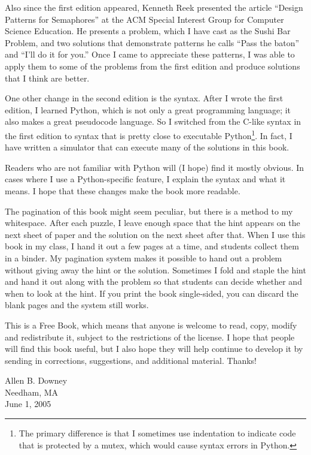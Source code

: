 \documentclass{book}
\begin{document}
Also since the first edition appeared, Kenneth Reek presented the article ``Design Patterns for Semaphores'' at the ACM Special Interest Group for Computer Science Education. He presents a problem, which I have cast as the Sushi Bar Problem, and two solutions that demonstrate patterns he calls ``Pass the baton'' and ``I'll do it for you.'' Once I came to appreciate these patterns, I was able to apply them to some of the problems from the first edition and produce solutions that I think are better.

One other change in the second edition is the syntax. After I wrote the first edition, I learned Python, which is not only a great programming language; it also makes a great pseudocode language.  So I switched from the C-like syntax in the first edition to syntax that is pretty close to executable Python\footnote{The primary difference is that I sometimes use indentation to indicate code that is protected by a mutex, which would cause syntax errors in Python.}. In fact, I have written a simulator that can execute many of the solutions in this book.

Readers who are not familiar with Python will (I hope) find it mostly obvious.  In cases where I use a Python-specific feature, I explain the syntax and what it means.  I hope that these changes make the book more readable.

The pagination of this book might seem peculiar, but there is a method to my whitespace.  After each puzzle, I leave enough space that the hint appears on the next sheet of paper and the solution on the next sheet after that.  When I use this book in my class, I hand it out a few pages at a time, and students collect them in a binder.  My pagination system makes it possible to hand out a problem without giving away the hint or the solution.  Sometimes I fold and staple the hint and hand it out along with the problem so that students can decide whether and when to look at the hint.  If you print the book single-sided, you can discard the blank pages and the system still works.

This is a Free Book, which means that anyone is welcome to read, copy, modify and redistribute it, subject to the restrictions of the license.  I hope that people will find this book useful, but I also hope they will help continue to develop it by sending in corrections, suggestions, and additional material.  Thanks!

\vspace{0.3in}

\noindent Allen B. Downey \\
\noindent Needham, MA \\
\noindent June 1, 2005 \\
\end{document}
